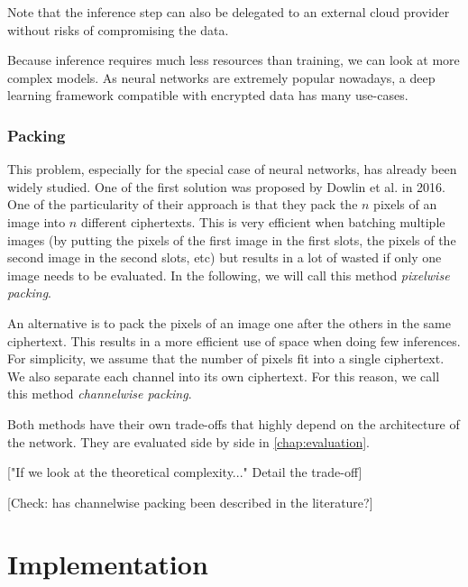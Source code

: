 \documentclass[a4paper,11pt,oneside]{report}
\begin{document}
Note that the inference step can also be delegated to an external cloud provider without risks of compromising the data.

Because inference requires much less resources than training, we can look at more complex models. As neural networks are extremely popular nowadays, a deep learning framework compatible with encrypted data has many use-cases.

\subsection{Packing}

This problem, especially for the special case of neural networks, has already been widely studied. One of the first solution was proposed by Dowlin et al. \cite{dowlin_cryptonets_2016} in 2016. One of the particularity of their approach is that they pack the $n$ pixels of an image into $n$ different ciphertexts. This is very efficient when batching multiple images (by putting the pixels of the first image in the first slots, the pixels of the second image in the second slots, etc) but results in a lot of wasted if only one image needs to be evaluated. In the following, we will call this method \emph{pixelwise packing}.

An alternative is to pack the pixels of an image one after the others in the same ciphertext. This results in a more efficient use of space when doing few inferences. For simplicity, we assume that the number of pixels fit into a single ciphertext. We also separate each channel into its own ciphertext. For this reason, we call this method \emph{channelwise packing}.

Both methods have their own trade-offs that highly depend on the architecture of the network. They are evaluated side by side in \autoref{chap:evaluation}.

["If we look at the theoretical complexity..." Detail the trade-off]

[Check: has channelwise packing been described in the literature?]


\chapter{Implementation}

\end{document}
